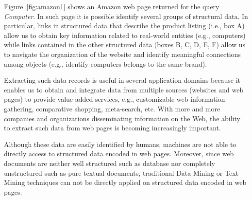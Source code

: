 Figure~\ref{fig:amazon1} shows an Amazon web page returned for the query \textit{Computer}. In such page it is possible identify several groups of structural data. In particular, links in structured data that describe the product listing (i.e., box A) allow us to obtain key information related to real-world entities (e.g., computers) while links contained in the other structured data (boxes B, C, D, E, F) allow us to navigate the organization of the website and identify meaningful connections among objects (e.g., identify computers belongs to the same brand).

Extracting such data records is useful in several application domains because it enables us to obtain and integrate data from multiple sources (websites and web pages) to provide value-added services, e.g., customizable web information gathering, comparative shopping, meta-search, etc. With more and more companies and organizations disseminating information on the Web, the ability to extract such data from
web pages is becoming increasingly important.


Although these data are easily identified by humans, machines are not able to directly access to structured data encoded in web pages. Moreover, since web documents are neither well structured such as database nor completely unstructured such as pure textual documents, traditional Data Mining or Text Mining techniques can not be directly applied on structured data encoded in web pages.

